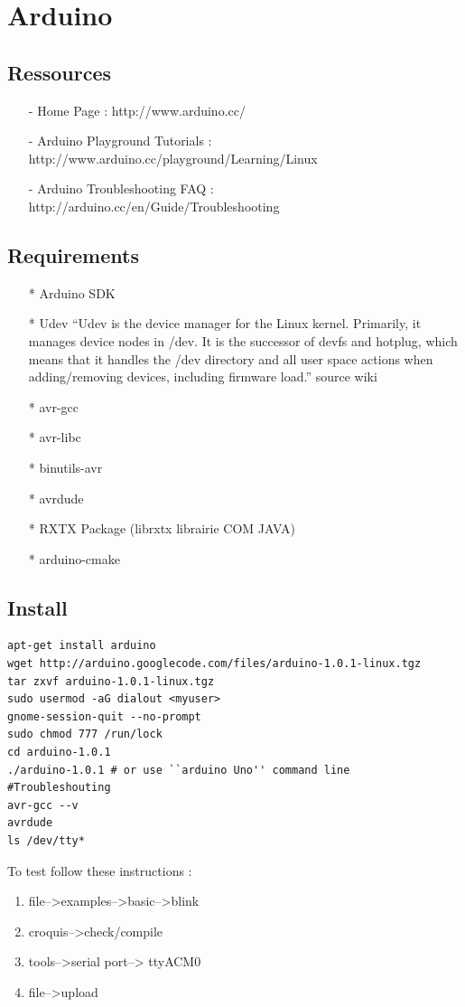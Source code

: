 \section{Arduino}
\subsection{Ressources}
\begin{itemize}
\item[-] Home Page : http://www.arduino.cc/
\item[-] Arduino Playground Tutorials : http://www.arduino.cc/playground/Learning/Linux
\item[-] Arduino Troubleshooting FAQ : http://arduino.cc/en/Guide/Troubleshooting
\end{itemize}
\subsection{Requirements}
\begin{itemize}
\item[*] Arduino SDK
\item[*] Udev
“Udev is the device manager for the Linux kernel. Primarily, it manages device nodes in /dev. It is the successor of devfs and hotplug, which means that it handles the /dev directory and all user space actions when adding/removing devices, including firmware load.” source wiki
\item[*] avr-gcc
\item[*] avr-libc
\item[*] binutils-avr
\item[*] avrdude 
\item[*] RXTX Package (librxtx librairie COM JAVA)
\item[*] arduino-cmake
\end{itemize}

\subsection{Install}
\begin{lstlisting}
apt-get install arduino
wget http://arduino.googlecode.com/files/arduino-1.0.1-linux.tgz
tar zxvf arduino-1.0.1-linux.tgz
sudo usermod -aG dialout <myuser>
gnome-session-quit --no-prompt
sudo chmod 777 /run/lock
cd arduino-1.0.1
./arduino-1.0.1 # or use ``arduino Uno'' command line
#Troubleshouting
avr-gcc --v 
avrdude
ls /dev/tty*
\end{lstlisting}
To test follow these instructions :
\begin{enumerate}
\item file–>examples–>basic–>blink
\item croquis–>check/compile
\item tools–>serial port–> ttyACM0
\item file–>upload
\end{enumerate}
